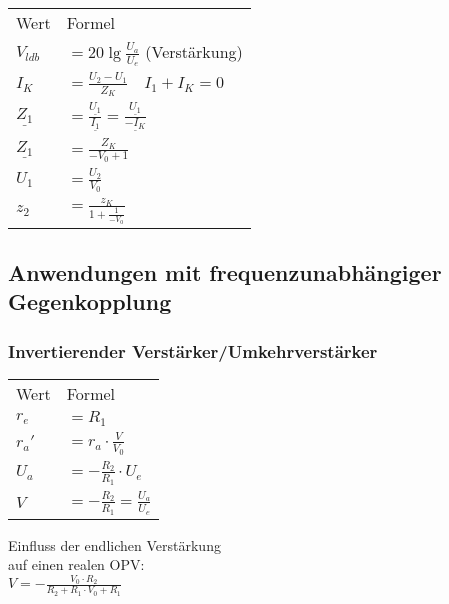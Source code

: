\begin{minipage}{0.5\columnwidth}
    \renewcommand{\arraystretch}{1.05}
    \begin{table}[H]
        \begin{tabularx}{\columnwidth}{l l}
            Wert                & Formel \\
            $V_{ldb}$           & $=20\lg\frac{U_a}{U_e}$ (Verstärkung)\\
            $I_K$               & $=\frac{U_2-U_1}{Z_K}\quad I_1+I_K=0$\\
            $\underline{Z_1}$   & $=\frac{\underline{U_1}}{\underline{I_1}}=\frac{\underline{U_1}}{\underline{-I_K}}$\\
            $\underline{Z_1}$   & $=\frac{Z_K}{-V_0+1}$\\
            $U_1$               & $=\frac{U_2}{V_0}$ \\
            $z_2$               & $=\frac{z_K}{1+\frac{1}{-V_0}}$
        \end{tabularx}
    \end{table}
\end{minipage}
\begin{minipage}{0.5\columnwidth}
\end{minipage}
\subsection{Anwendungen mit frequenzunabhängiger Gegenkopplung}
    \subsubsection{Invertierender Verstärker/Umkehrverstärker}
        \begin{minipage}{0.6\columnwidth}
            \renewcommand{\arraystretch}{1.05}
            \begin{table}[H]
                \begin{tabularx}{\columnwidth}{l l}
                    Wert    & Formel \\
                    $r_e$   & $=R_1$ \\
                    $r_a'$  & $=r_a\cdot\frac{V}{V_0}$\\
                    $U_a$   & $=-\frac{R_2}{R_1}\cdot U_e$ \\
                    $V$     & $=-\frac{R_2}{R_1}=\frac{U_a}{U_e}$ \\
                \end{tabularx}
            \end{table}
            Einfluss der endlichen Verstärkung\\auf einen realen OPV:\\
            $V=-\frac{V_0\cdot R_2}{R_2+R_1\cdot V_0+R_1}$
        \end{minipage}
        \begin{minipage}{0.4\columnwidth}
        \end{minipage}
